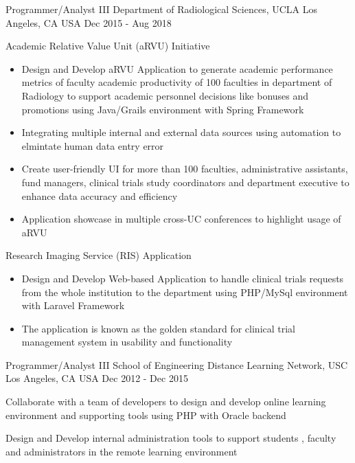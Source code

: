 \begin{cventries}
  \cventry
    {Programmer/Analyst III} %
    {Department of Radiological Sciences, UCLA} %
    {Los Angeles, CA USA} %
    {Dec 2015 - Aug 2018} %
    {
       \begin{cvitems} %
        \item[] {Academic Relative Value Unit (aRVU) Initiative
            \begin{itemize} %
                \item {Design and Develop aRVU Application to generate academic performance metrics of faculty academic productivity of 100 faculties in department of Radiology to support academic personnel decisions like bonuses and promotions using Java/Grails environment with Spring Framework}
                \item {Integrating multiple internal and external data sources using automation to elmintate human data entry error}
                \item {Create user-friendly UI for more than 100 faculties, administrative assistants, fund managers, clinical trials study coordinators and department executive to enhance data accuracy and efficiency}
                \item {Application showcase in multiple cross-UC conferences to highlight usage of aRVU}
              \end{itemize}}
        \item[] {Research Imaging Service (RIS) Application 
            \begin{itemize} %
                \item {Design and Develop Web-based Application to handle clinical trials requests from the whole institution to the department using PHP/MySql environment with Laravel Framework}
                \item {The application is known as the golden standard for clinical trial management system in usability and functionality}
              \end{itemize}}
      \end{cvitems}
    }
	
  \cventry
    {Programmer/Analyst III} %
    {School of Engineering Distance Learning Network, USC} %
    {Los Angeles, CA USA} %
    {Dec 2012 - Dec 2015} %
    {
      \begin{cvitems} %
        \item {Collaborate with a team of developers to design and develop online learning environment and supporting tools using PHP with Oracle backend}
        \item {Design and Develop internal administration tools to support students , faculty and administrators  in the remote learning environment}       
      \end{cvitems}
    }


\end{cventries}
